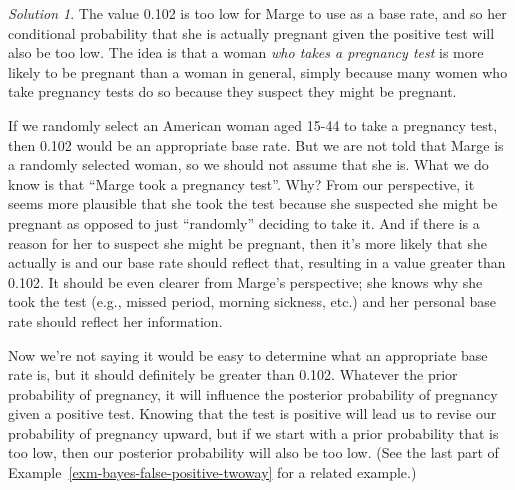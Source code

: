 \documentclass[
  letterpaper,
  DIV=11,
  numbers=noendperiod]{scrreprt}
\theoremstyle{plain}
\theoremstyle{definition}
\theoremstyle{definition}
\theoremstyle{definition}
\theoremstyle{remark}
\newtheorem{refsolution}{Solution}[chapter]
\begin{document}
\begin{tcolorbox}[enhanced jigsaw, opacityback=0, rightrule=.15mm, coltitle=black, colframe=quarto-callout-tip-color-frame, toprule=.15mm, colbacktitle=quarto-callout-tip-color!10!white, opacitybacktitle=0.6, left=2mm, toptitle=1mm, breakable, title={Solution (click to expand)}, bottomtitle=1mm, colback=white, leftrule=.75mm, titlerule=0mm, arc=.35mm, bottomrule=.15mm]

\begin{refsolution}
The value 0.102 is too low for Marge to use as a base rate, and so her
conditional probability that she is actually pregnant given the positive
test will also be too low. The idea is that a woman \emph{who takes a
pregnancy test} is more likely to be pregnant than a woman in general,
simply because many women who take pregnancy tests do so because they
suspect they might be pregnant\footnotemark{}.

If we randomly select an American woman aged 15-44 to take a pregnancy
test, then 0.102 would be an appropriate base rate. But we are not told
that Marge is a randomly selected woman, so we should not assume that
she is. What we do know is that ``Marge took a pregnancy test''. Why?
From our perspective, it seems more plausible that she took the test
because she suspected she might be pregnant as opposed to just
``randomly'' deciding to take it. And if there is a reason for her to
suspect she might be pregnant, then it's more likely that she actually
is and our base rate should reflect that, resulting in a value greater
than 0.102. It should be even clearer from Marge's perspective; she
knows why she took the test (e.g., missed period, morning sickness,
etc.) and her personal base rate should reflect her information.

Now we're not saying it would be easy to determine what an appropriate
base rate is, but it should definitely be greater than 0.102. Whatever
the prior probability of pregnancy, it will influence the posterior
probability of pregnancy given a positive test. Knowing that the test is
positive will lead us to revise our probability of pregnancy upward, but
if we start with a prior probability that is too low, then our posterior
probability will also be too low. (See the last part of
Example~\ref{exm-bayes-false-positive-twoway} for a related example.)

\label{sol-base-rate-pregnancy}

\end{refsolution}

\end{tcolorbox}
\end{document}
